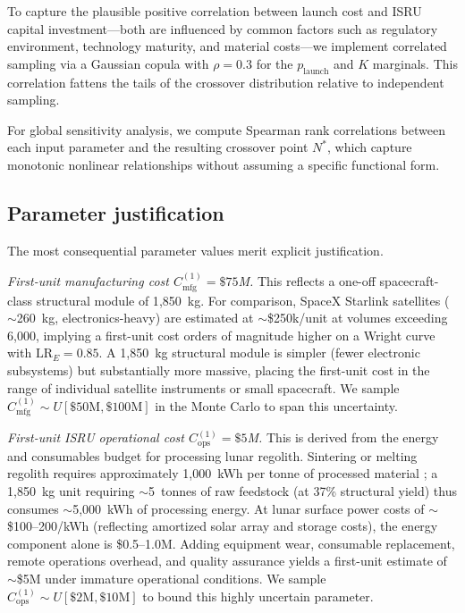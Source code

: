 \documentclass[preprint,12pt]{elsarticle}
\begin{document}
To capture the plausible positive correlation between launch cost and ISRU capital investment---both are influenced by common factors such as regulatory environment, technology maturity, and material costs---we implement correlated sampling via a Gaussian copula with $\rho = 0.3$ for the $p_{\mathrm{launch}}$ and $K$ marginals. This correlation fattens the tails of the crossover distribution relative to independent sampling.

For global sensitivity analysis, we compute Spearman rank correlations between each input parameter and the resulting crossover point $N^*$, which capture monotonic nonlinear relationships without assuming a specific functional form.

\subsection{Parameter justification}
\label{sec:param_justification}

The most consequential parameter values merit explicit justification.

\emph{First-unit manufacturing cost $C_{\mathrm{mfg}}^{(1)} = \$75$M.} This reflects a one-off spacecraft-class structural module of 1{,}850~kg. For comparison, SpaceX Starlink satellites ($\sim$260~kg, electronics-heavy) are estimated at $\sim$\$250k/unit at volumes exceeding 6{,}000, implying a first-unit cost orders of magnitude higher on a Wright curve with $\mathrm{LR}_E = 0.85$. A 1{,}850~kg structural module is simpler (fewer electronic subsystems) but substantially more massive, placing the first-unit cost in the range of individual satellite instruments or small spacecraft. We sample $C_{\mathrm{mfg}}^{(1)} \sim U[\$50\text{M}, \$100\text{M}]$ in the Monte Carlo to span this uncertainty.

\emph{First-unit ISRU operational cost $C_{\mathrm{ops}}^{(1)} = \$5$M.} This is derived from the energy and consumables budget for processing lunar regolith. Sintering or melting regolith requires approximately 1{,}000~kWh per tonne of processed material \cite{cilliers2023}; a 1{,}850~kg unit requiring $\sim$5~tonnes of raw feedstock (at 37\% structural yield) thus consumes $\sim$5{,}000~kWh of processing energy. At lunar surface power costs of $\sim$\$100--200/kWh (reflecting amortized solar array and storage costs), the energy component alone is \$0.5--1.0M. Adding equipment wear, consumable replacement, remote operations overhead, and quality assurance yields a first-unit estimate of $\sim$\$5M under immature operational conditions. We sample $C_{\mathrm{ops}}^{(1)} \sim U[\$2\text{M}, \$10\text{M}]$ to bound this highly uncertain parameter.
\end{document}
